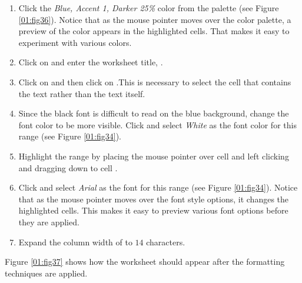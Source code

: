 \begin{enumbox}
\begin{enumerate}
		\item Click the \textit{Blue, Accent 1, Darker 25\%} color from the palette (see Figure \ref{01:fig36}). Notice that as the mouse pointer moves over the color palette, a preview of the color appears in the highlighted cells. That makes it easy to experiment with various colors.
		\item Click on  and enter the worksheet title, .
		\item Click on  and then click on .This is necessary to select the cell that contains the text rather than the text itself.
		\item Since the black font is difficult to read on the blue background, change the font color to be more visible. Click  and select \textit{White} as the font color for this range (see Figure \ref{01:fig34}).
		\item Highlight the range  by placing the mouse pointer over cell  and left clicking and dragging down to cell .
		\item Click  and select \textit{Arial} as the font for this range (see Figure \ref{01:fig34}). Notice that as the mouse pointer moves over the font style options, it changes the highlighted cells. This makes it easy to preview various font options before they are applied.
		\item Expand the column width of  to $ 14 $ characters.
	\end{enumerate}
\end{enumbox}

Figure \ref{01:fig37} shows how the  worksheet should appear after the formatting techniques are applied.


